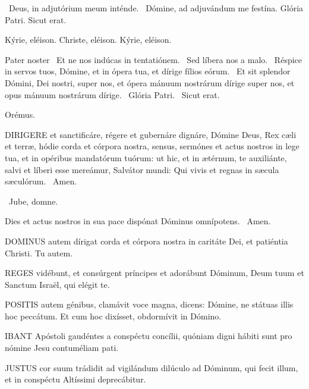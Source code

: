 \V\ Deus, in adjutórium meum inténde. \R\ Dómine, ad adjuvándum me festína.  Glória Patri. Sicut erat.

Kýrie, eléison. Christe, eléison. Kýrie, eléison.

Pater noster  \V\ Et ne nos indúcas in tentatiónem. \R\ Sed líbera nos a malo. \V\ Réspice in servos tuos, Dómine, et in ópera tua, et dírige fílios eórum. \R\ Et sit splendor Dómini, Dei nostri, super nos, et ópera mánuum nostrárum dírige super nos, et opus mánuum nostrárum dírige. \V\ Glória Patri. \R\ Sicut erat.

Orémus. 

\lettrine[lines=2]{D}{IRIGERE} et sanctificáre, régere et gubernáre dignáre, Dómine Deus, Rex cæli et terræ, hódie corda et córpora nostra, sensus, sermónes et actus nostros in lege tua, et in opéribus mandatórum tuórum: ut hic, et in ætérnum, te auxiliánte, salvi et líberi esse mereámur, Salvátor mundi: Qui vivis et regnas in sæcula sæculórum. \R\ Amen.

\V\ Jube, domne.

 Dies et actus nostros in sua pace dispónat Dóminus omnípotens. \R\ Amen.


\lettrine[lines=2]{D}{OMINUS} autem dírigat corda et córpora nostra in caritáte Dei, et patiéntia Christi. Tu autem.



\lettrine[lines=2]{R}{EGES} vidébunt, et consúrgent príncipes et adorábunt Dóminum, Deum tuum et Sanctum Israël, qui elégit te.


\lettrine[lines=2]{P}{OSITIS} autem génibus, clamávit voce magna, dicens: Dómine, ne státuas illis hoc peccátum. Et cum hoc dixísset, obdormívit in Dómino.



\lettrine[lines=2]{I}{BANT} Apóstoli gaudéntes a conspéctu concílii, quóniam digni hábiti sunt pro nómine Jesu contuméliam pati.


\lettrine[lines=2]{J}{USTUS} cor suum trádidit ad vigilándum dilúculo ad Dóminum, qui fecit illum, et in conspéctu Altíssimi deprecábitur.

